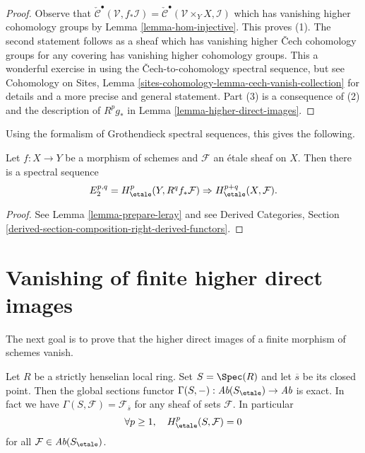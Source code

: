 \begin{proof}
Observe that $\check{\mathcal{C}}^\bullet(\mathcal{V}, f_*\mathcal{I}) =
\check{\mathcal{C}}^\bullet(\mathcal{V} \times_Y X, \mathcal{I})$
which has vanishing higher cohomology groups by Lemma \ref{lemma-hom-injective}.
This proves (1). The second statement follows as a sheaf which has
vanishing higher {\v C}ech cohomology groups for any covering has vanishing
higher cohomology groups. This a wonderful exercise in using the
{\v C}ech-to-cohomology spectral sequence, but see
Cohomology on Sites, Lemma \ref{sites-cohomology-lemma-cech-vanish-collection}
for details and a more precise and general statement.
Part (3) is a consequence of (2) and the description of
$R^pg_*$ in Lemma \ref{lemma-higher-direct-images}.
\end{proof}

\noindent
Using the formalism of Grothendieck spectral sequences, this gives the
following.

\begin{proposition}
\label{proposition-leray}
Let $f: X \to Y$ be a morphism of schemes and $\mathcal{F}$ an \'etale sheaf on
$X$. Then there is a spectral sequence
$$
E_2^{p, q} = H_\etale^p(Y, R^qf_*\mathcal{F}) \Rightarrow
H_\etale^{p+q}(X, \mathcal{F}).
$$
\end{proposition}

\begin{proof}
See Lemma \ref{lemma-prepare-leray} and see
Derived Categories, Section
\ref{derived-section-composition-right-derived-functors}.
\end{proof}









\section{Vanishing of finite higher direct images}
\label{section-vanishing-finite-morphism}

\noindent
The next goal is to prove that the higher direct images of a finite morphism of
schemes vanish.

\begin{lemma}
\label{lemma-vanishing-etale-cohomology-strictly-henselian}
Let $R$ be a strictly henselian local ring. Set $S = \Spec(R)$ and let
$\overline{s}$ be its closed point. Then the global
sections functor
$\Gamma(S, -) : \textit{Ab}(S_\etale) \to \textit{Ab}$
is exact. In fact we have $\Gamma(S, \mathcal{F}) = \mathcal{F}_{\overline{s}}$
for any sheaf of sets $\mathcal{F}$. In particular
$$
\forall p\geq 1, \quad H_\etale^p(S, \mathcal{F})=0
$$
for all $\mathcal{F}\in \textit{Ab}(S_\etale)$.
\end{lemma}

